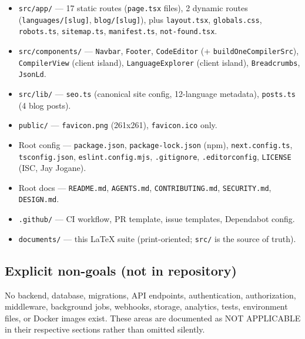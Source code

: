 \begin{itemize}
\item \texttt{src/app/} --- 17 static routes (\texttt{page.tsx} files), 2 dynamic routes (\texttt{languages/[slug]}, \texttt{blog/[slug]}), plus \texttt{layout.tsx}, \texttt{globals.css}, \texttt{robots.ts}, \texttt{sitemap.ts}, \texttt{manifest.ts}, \texttt{not-found.tsx}.
\item \texttt{src/components/} --- \texttt{Navbar}, \texttt{Footer}, \texttt{CodeEditor} (+ \texttt{buildOneCompilerSrc}), \texttt{CompilerView} (client island), \texttt{LanguageExplorer} (client island), \texttt{Breadcrumbs}, \texttt{JsonLd}.
\item \texttt{src/lib/} --- \texttt{seo.ts} (canonical site config, 12-language metadata), \texttt{posts.ts} (4 blog posts).
\item \texttt{public/} --- \texttt{favicon.png} (261x261), \texttt{favicon.ico} only.
\item Root config --- \texttt{package.json}, \texttt{package-lock.json} (npm), \texttt{next.config.ts}, \texttt{tsconfig.json}, \texttt{eslint.config.mjs}, \texttt{.gitignore}, \texttt{.editorconfig}, \texttt{LICENSE} (ISC, Jay Jogane).
\item Root docs --- \texttt{README.md}, \texttt{AGENTS.md}, \texttt{CONTRIBUTING.md}, \texttt{SECURITY.md}, \texttt{DESIGN.md}.
\item \texttt{.github/} --- CI workflow, PR template, issue templates, Dependabot config.
\item \texttt{documents/} --- this LaTeX suite (print-oriented; \texttt{src/} is the source of truth).
\end{itemize}

\subsection{Explicit non-goals (not in repository)}
No backend, database, migrations, API endpoints, authentication, authorization, middleware, background jobs, webhooks, storage, analytics, tests, environment files, or Docker images exist. These areas are documented as NOT APPLICABLE in their respective sections rather than omitted silently.
